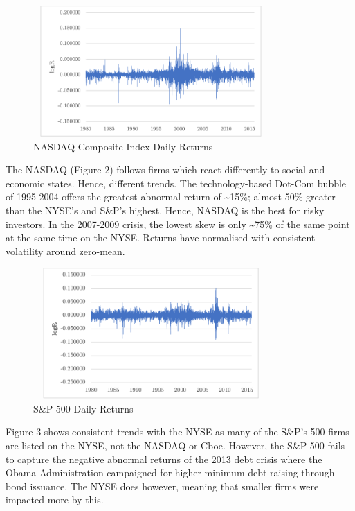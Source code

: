 \documentclass[11pt, english]{article}
\begin{document}
	\begin{figure}[H]
        \begin{center}
                \includegraphics[width=9cm,height=5cm]{NASDAQ-Returns.png}
                \caption{NASDAQ Composite Index Daily Returns}
        \end{center}
        \end{figure}

	The NASDAQ (Figure 2) follows firms which react differently to social and economic states. Hence, different trends. The technology-based Dot-Com bubble of 1995-2004 offers the greatest abnormal return of \~{}15\%; almost 50\% greater than the NYSE’s and S\&P’s highest. Hence, NASDAQ is the best for risky investors. In the 2007-2009 crisis, the lowest skew is only \~{}75\% of the same point at the same time on the NYSE. Returns have normalised with consistent volatility around zero-mean.\\

	\begin{figure}[H]
        \begin{center}
		\includegraphics[width=9cm,height=5cm]{S&P-Returns.png}
		\caption{S\&P 500 Daily Returns}
        \end{center}
        \end{figure}
	
	Figure 3 shows consistent trends with the NYSE as many of the S\&P’s 500 firms are listed on the NYSE, not the NASDAQ or Cboe. However, the S\&P 500 fails to capture the negative abnormal returns of the 2013 debt crisis where the Obama Administration campaigned for higher minimum debt-raising through bond issuance. The NYSE does however, meaning that smaller firms were impacted more by this.
\end{document}

